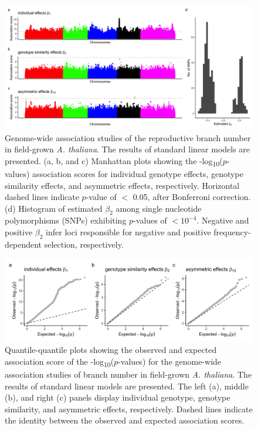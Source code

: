 \documentclass[12pt,]{article}
\begin{document}
\begin{figure}[]
  \includegraphics[width=\linewidth]{ManhattanLM.png}
  \caption{Genome-wide association studies of the reproductive branch number in field-grown \textit{A. thaliana}. The results of standard linear models are presented. (a, b, and c) Manhattan plots showing the -log\textsubscript{10}($p$-values) association scores for individual genotype effects, genotype similarity effects, and asymmetric effects, respectively. Horizontal dashed lines indicate $p$-value of $<$ 0.05, after Bonferroni correction. (d) Histogram of estimated $\beta_2$ among single nucleotide polymorphisms (SNPs) exhibiting $p$-values of $< 10^{-4}$. Negative and positive $\beta_2$ infer loci responsible for negative and positive frequency-dependent selection, respectively.}
  \label{figS10:gwasLM}
\end{figure}

\begin{figure}[]
  \includegraphics[width=\linewidth]{QQplotLM.png}
  \caption{Quantile-quantile plots showing the observed and expected association score of the -log\textsubscript{10}($p$-values) for the genome-wide association studies of branch number in field-grown \textit{A. thaliana}. The results of standard linear models are presented. The left (a), middle (b), and right (c) panels display individual genotype, genotype similarity, and asymmetric effects, respectively. Dashed lines indicate the identity between the observed and expected association scores.}
  \label{figS11:QQplotLM}
\end{figure}
\end{document}
